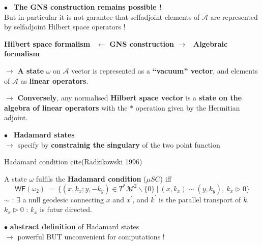 \documentclass[11pt]{book}
\newcommand{\WF}{\mathsf{WF}}
\newcommand{\Acal}{\mathcal{A}}
\newcommand{\Mcal}{\mathcal{M}}
\theoremstyle{break}
\begin{document}
\bigskip

$\bullet$ \ \textbf{The GNS construction remains possible !} \\
\hspace*{8pt} But in particular it is not garantee that selfadjoint elements of $\Acal$ are \hspace*{8pt} represented by selfadjoint Hilbert space operators ! \\
\begin{center}
\textbf{Hilbert space formalism} \ $\leftarrow$ \textbf{GNS construction} $\rightarrow$ \ \textbf{Algebraic formalism}
\end{center}

$\to$ \textbf{A state} $\omega$ on $\Acal$ vector is represented as a \textbf{``vacuum'' vector}, and elements \hspace*{9pt} of $\Acal$ as \textbf{linear operators}. \\

\bigskip

$\to$ \textbf{Conversely}, any normalised \textbf{Hilbert space vector} is a \textbf{state on the algebra \hspace*{9pt} of linear operators} with the $\ast$ operation given by the Hermitian adjoint.


\bigskip

$\bullet$ \ \textbf{Hadamard states} \\ 
\qquad $\to$ specify by \textbf{constrainig the singulary} of the two point function

\bigskip

Hadamard condition cite(Radzikowski 1996)\par
A state $\omega$ fulfils the \textbf{Hadamard condition} ($\mu S C$) iff
\begin{equation*}
 \WF(\omega_{2}) \ = \ \bigg\{ (x,k_x ; y,-k_y) \in T^\ast\Mcal^2 \backslash \{0\} \ \bigg| \ (x,k_x) \sim (y,k_y) , \ k_x \triangleright 0 \bigg\}
\end{equation*}
$\sim$ : $\exists$ a null geodesic connecting $x$ and $x^\prime$, and $k^\prime$ is the parallel transport of $k$. \\
$k_x \triangleright 0$ : $k_x$ is futur directed.


\bigskip

$\bullet$ \textbf{abstract definition} of Hadamard states \\
\qquad $\to$ powerful BUT unconvenient for computations !
\end{document}
